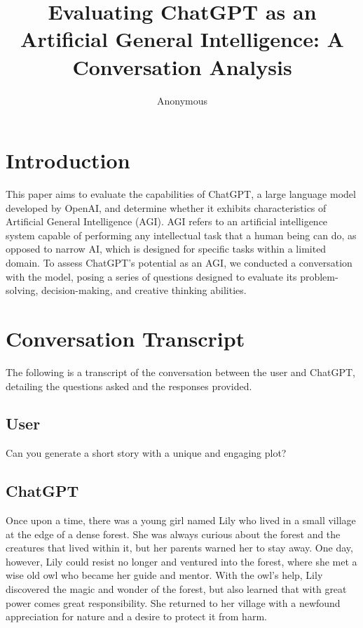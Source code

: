 \documentclass{article}
\title{Evaluating ChatGPT as an Artificial General Intelligence: A Conversation Analysis}
\author{Anonymous}
\date{}
\begin{document}
\maketitle

\section{Introduction}

This paper aims to evaluate the capabilities of ChatGPT, a large language model developed by OpenAI, and determine whether it exhibits characteristics of Artificial General Intelligence (AGI). AGI refers to an artificial intelligence system capable of performing any intellectual task that a human being can do, as opposed to narrow AI, which is designed for specific tasks within a limited domain. To assess ChatGPT's potential as an AGI, we conducted a conversation with the model, posing a series of questions designed to evaluate its problem-solving, decision-making, and creative thinking abilities.

\section{Conversation Transcript}

The following is a transcript of the conversation between the user and ChatGPT, detailing the questions asked and the responses provided.



\subsection*{User}
Can you generate a short story with a unique and engaging plot?

\subsection*{ChatGPT}
Once upon a time, there was a young girl named Lily who lived in a small village at the edge of a dense forest. She was always curious about the forest and the creatures that lived within it, but her parents warned her to stay away. One day, however, Lily could resist no longer and ventured into the forest, where she met a wise old owl who became her guide and mentor. With the owl's help, Lily discovered the magic and wonder of the forest, but also learned that with great power comes great responsibility. She returned to her village with a newfound appreciation for nature and a desire to protect it from harm.
\end{document}
